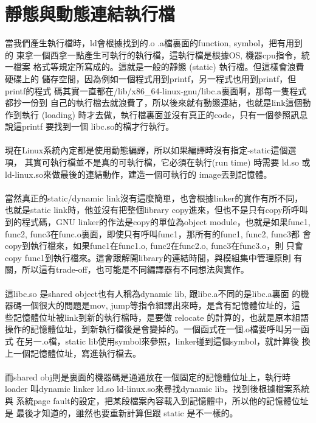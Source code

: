   \section{靜態與動態連結執行檔}
    當我們產生執行檔時，ld會根據找到的.o .a檔裏面的function, symbol，把有用到的
    東拿一個西拿一點產生可執行的執行檔，這執行檔是根據OS, 機器cpu指令，統一檔案
    格式等規定所寫成的。這就是一般的靜態 (static) 執行檔。但這樣會浪費硬碟上的
    儲存空間，因為例如一個程式用到printf，另一程式也用到printf，但printf的程式
    碼其實一直都在/lib/x86\_64-linux-gnu/libc.a裏面啊，那每一隻程式都抄一份到
    自己的執行檔去就浪費了，所以後來就有動態連結，也就是link這個動作到執行
    (loading) 時才去做，執行檔裏面並沒有真正的code，只有一個參照訊息說這printf
    要找到一個 libc.so的檔才行執行。
    \\\\
    現在Linux系統內定都是使用動態編譯，所以如果編譯時沒有指定-static這個選項，
    其實可執行檔並不是真的可執行檔，它必須在執行(run time) 時需要 ld.so 或
    ld-linux.so來做最後的連結動作，建造一個可執行的 image丟到記憶體。
    \\\\
    當然真正的static/dynamic link沒有這麼簡單，也會根據linker的實作有所不同，
    也就是static link時，他並沒有把整個library copy進來，但也不是只有copy所呼叫
    到的程式碼，GNU linker的作法是copy的單位為object module，也就是如果func1, 
    func2, func3在func.o裏面，即使只有呼叫func1，那所有的func1, func2, func3都
    會copy到執行檔來，如果func1在func1.o, func2在func2.o, func3在func3.o，則
    只會copy func1到執行檔來。這會跟解開library的連結時間，與模組集中管理原則
    有關，所以這有trade-off，也可能是不同編譯器有不同想法與實作。
    \\\\
    這libc.so 是shared object也有人稱為dynamic lib, 跟libc.a不同的是libc.a裏面
    的機器碼一個很大的問題是mov, jump等指令組譯出來時，是含有記憶體位址的，這
    些記憶體位址被link到新的執行檔時，是要做 relocate 的計算的，也就是原本組語
    操作的記憶體位址，到新執行檔後是會變掉的。一個函式在一個.o檔要呼叫另一函式
    在另一.o檔，static lib使用symbol來參照，linker碰到這個symbol，就計算後
    換上一個記憶體位址，寫進執行檔去。
    \\\\
    而shared obj則是裏面的機器碼是通通放在一個固定的記憶體位址上，執行時loader
    叫dynamic linker ld.so ld-linux.so來尋找dynamic lib。找到後根據檔案系統與
    系統page fault的設定，把某段檔案內容載入到記憶體中，所以他的記憶體位址是
    最後才知道的，雖然也要重新計算但跟 static 是不一樣的。
